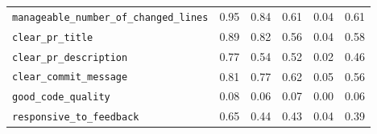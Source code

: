 \begin{table}[!htbp]
\begin{tabular}{lccccc}
\texttt{manageable\_number\_of\_changed\_lines} & 0.95 & 0.84 & 0.61 & 0.04 & 0.61 \\
\texttt{clear\_pr\_title} & 0.89 & 0.82 & 0.56 & 0.04 & 0.58 \\
\texttt{clear\_pr\_description} & 0.77 & 0.54 & 0.52 & 0.02 & 0.46 \\
\texttt{clear\_commit\_message} & 0.81 & 0.77 & 0.62 & 0.05 & 0.56 \\
\texttt{good\_code\_quality} & 0.08 & 0.06 & 0.07 & 0.00 & 0.06 \\
\texttt{responsive\_to\_feedback} & 0.65 & 0.44 & 0.43 & 0.04 & 0.39 \\
\bottomrule
\end{tabular}
\end{table}
